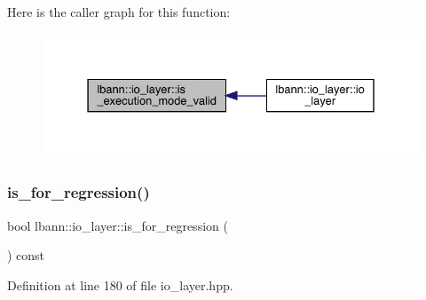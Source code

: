 Here is the caller graph for this function\+:\nopagebreak
\begin{figure}[H]
\begin{center}
\leavevmode
\includegraphics[width=331pt]{classlbann_1_1io__layer_a37e2f77a99ee44106ac7d9fd3a275dcc_icgraph}
\end{center}
\end{figure}
\mbox{\label{classlbann_1_1io__layer_a61f2e00334c820235795154492876476}} 
\subsubsection{\texorpdfstring{is\+\_\+for\+\_\+regression()}{is\_for\_regression()}}
{\footnotesize\ttfamily bool lbann\+::io\+\_\+layer\+::is\+\_\+for\+\_\+regression (\begin{DoxyParamCaption}{ }\end{DoxyParamCaption}) const\hspace{0.3cm}{\ttfamily [inline]}}



Definition at line 180 of file io\+\_\+layer.\+hpp.



